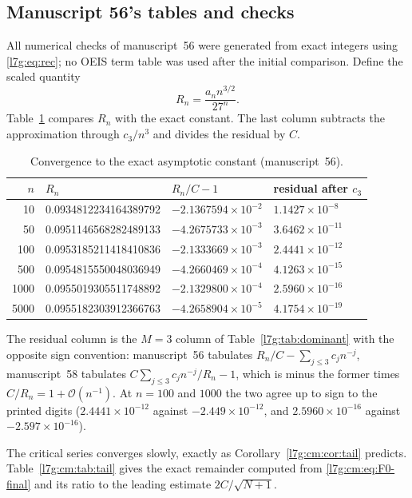 \documentclass[11pt,letterpaper]{article}
\theoremstyle{remark}\newtheorem{remark}[theorem]{Remark}
\newcommand{\bigO}{\mathcal O}\newcommand{\Ct}{C_{t}}
\newcounter{l7gtrsavedeq}
\begin{document}
\subsection{Manuscript 56's tables and checks}\label{l7g:cm:sec:verification}
All numerical checks of manuscript~56 were generated from exact integers
using \eqref{l7g:eq:rec}; no OEIS term table was used after the initial
comparison. Define the scaled quantity
\begin{equation}\label{l7g:cm:eq:qn}
 R_n=\frac{a_n n^{3/2}}{27^n}.
\end{equation}
Table~\ref{l7g:cm:tab:convergence} compares $R_n$ with the exact constant.
The last column subtracts the approximation through $c_3/n^3$ and
divides the residual by $C$.

\begin{table}[htbp]
\centering\small
\caption{Convergence to the exact asymptotic constant (manuscript~56).}
\label{l7g:cm:tab:convergence}
\begin{tabular}{rlll}
\toprule
$n$ & $R_n$ & $R_n/C-1$ & residual after $c_3$ \\
\midrule
10   & 0.0934812234164389792 & $-2.1367594\times10^{-2}$ & $1.1427\times10^{-8}$\\
50   & 0.0951146568282489133 & $-4.2675733\times10^{-3}$ & $3.6462\times10^{-11}$\\
100  & 0.0953185211418410836 & $-2.1333669\times10^{-3}$ & $2.4441\times10^{-12}$\\
500  & 0.0954815550048036949 & $-4.2660469\times10^{-4}$ & $4.1263\times10^{-15}$\\
1000 & 0.0955019305511748892 & $-2.1329800\times10^{-4}$ & $2.5960\times10^{-16}$\\
5000 & 0.0955182303912366763 & $-4.2658904\times10^{-5}$ & $4.1754\times10^{-19}$\\
\bottomrule
\end{tabular}
\end{table}
The residual column is the $M=3$ column of Table~\ref{l7g:tab:dominant}
with the opposite sign convention: manuscript~56 tabulates
$R_n/C-\sum_{j\le3}c_jn^{-j}$, manuscript~58 tabulates
$C\sum_{j\le3}c_jn^{-j}/R_n-1$, which is minus the former times
$C/R_n=1+\bigO(n^{-1})$. At $n=100$ and $1000$ the two agree up to sign
to the printed digits ($2.4441\times10^{-12}$ against
$-2.449\times10^{-12}$, and $2.5960\times10^{-16}$ against
$-2.597\times10^{-16}$).

The critical series converges slowly, exactly as
Corollary~\ref{l7g:cm:cor:tail} predicts. Table~\ref{l7g:cm:tab:tail} gives
the exact remainder computed from \eqref{l7g:cm:eq:F0-final} and its ratio
to the leading estimate $2C/\sqrt{N+1}$.
\end{document}

